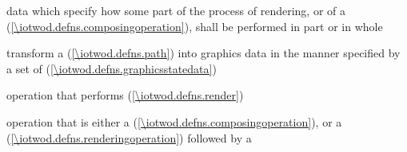 %
data which specify how some part of the process of rendering, or of a  (\ref{\iotwod.defns.composingoperation}), shall be performed in part or in whole

%
transform a  (\ref{\iotwod.defns.path}) into graphics data in the manner specified by a set of  (\ref{\iotwod.defns.graphicsstatedata})

%
operation that performs  (\ref{\iotwod.defns.render})

%
operation that is either a  (\ref{\iotwod.defns.composingoperation}), or a  (\ref{\iotwod.defns.renderingoperation}) followed by a 

%

%
%

